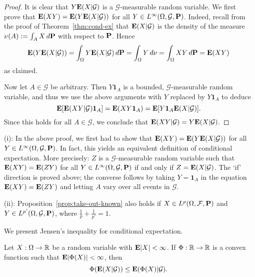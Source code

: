 \begin{proof}
It is clear that $Y \mathbf{E}(X|\mathcal{G})$ is a $\mathcal{G}$-measurable random variable. We first prove that $\mathbf{E}(XY) = \mathbf{E}(Y \mathbf{E}(X|\mathcal{G}))$ for all $Y\in L^\infty(\Omega,\mathcal{G},\mathbf{P})$. Indeed, recall from the proof of Theorem~\ref{thm:cond-ex} that $\mathbf{E}(X|\mathcal{G})$ is the density of the measure $\nu(A) := \int_A X \,d\mathbf{P}$ with respect to $\mathbf{P}$. Hence
\begin{equation*}
    \mathbf{E}(Y \mathbf{E}(X|\mathcal{G})) = \int_\Omega Y \mathbf{E}(X|\mathcal{G}) \,d\mathbf{P} = \int_\Omega Y \,d\nu = \int_\Omega XY \,d\mathbf{P} = \mathbf{E}(XY)
\end{equation*}
as claimed.

Now let $A\in\mathcal{G}$ be arbitrary. Then $Y\mathbf{1}_A$ is a bounded, $\mathcal{G}$-measurable random variable, and thus we use the above arguments with $Y$ replaced by $Y\mathbf{1}_A$ to deduce
\begin{equation*}
    \mathbf{E}[\mathbf{E}(XY|\mathcal{G})\mathbf{1}_A] = \mathbf{E}(XY\mathbf{1}_A) = \mathbf{E}[Y\mathbf{1}_A \mathbf{E}(X|\mathcal{G})].
\end{equation*}
Since this holds for all $A\in\mathcal{G}$, we conclude that $\mathbf{E}(XY|\mathcal{G}) = Y \mathbf{E}(X|\mathcal{G})$.
\end{proof}

\begin{remark}
    (i): In the above proof, we first had to show that $\mathbf{E}(XY)=\mathbf{E}(Y\mathbf{E}(X|\mathcal{G}))$ for all $Y\in L^\infty(\Omega,\mathcal{G},\mathbf{P})$. In fact, this yields an equivalent definition of conditional expectation. More precisely: $Z$ is a $\mathcal{G}$-measurable random variable such that $\mathbf{E}(XY)=\mathbf{E}(ZY)$ for all $Y\in L^\infty(\Omega,\mathcal{G},\mathbf{P})$ if and only if $Z=\mathbf{E}(X|\mathcal{G})$. The `if' direction is proved above; the converse follows by taking $Y=\mathbf{1}_A$ in the equation $\mathbf{E}(XY)=\mathbf{E}(ZY)$ and letting $A$ vary over all events in $\mathcal{G}$.

    (ii): Proposition~\ref{prop:take-out-known} also holds if $X\in L^p(\Omega,\mathcal{F},\mathbf{P})$ and $Y\in L^{p'}(\Omega,\mathcal{G},\mathbf{P})$, where $\frac{1}{p}+\frac{1}{p'}=1$.
\end{remark}

We present Jensen's inequality for conditional expectation.
\begin{theorem}
    Let $X:\Omega\to\mathbb{R}$ be a random variable with $\mathbf{E}|X| < \infty$. If $\Phi : \mathbb{R}\to\mathbb{R}$ is a convex function such that $\mathbf{E}|\Phi(X)| < \infty$, then
    \begin{equation*}
        \Phi(\mathbf{E}(X|\mathcal{G})) \le \mathbf{E}(\Phi(X)|\mathcal{G}).
    \end{equation*}
\end{theorem}

